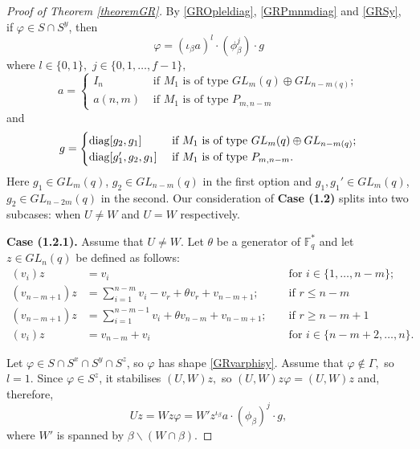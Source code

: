 \begin{proof}[Proof of Theorem {\rm \ref{theoremGR}}]
 By \eqref{GROpleldiag}, \eqref{GRPmnmdiag} and \eqref{GRSy}, if $\varphi \in S \cap S^y$, then 
\begin{equation}
\label{GRvarphisy}
\varphi = (\iota_{\beta} a )^l \cdot (\phi_{\beta}^j) \cdot g
\end{equation}
where $l \in \{0,1\},$ $j \in \{0, 1, \ldots, f-1\},$
$$a = \begin{cases}
I_n  &  \text{ if } M_1 \text{ is of type } GL_m(q) \oplus GL_{n-m(q)};\\
a(n,m) & \text{ if } M_1 \text{ is of type } P_{m, n-m}

\end{cases}
$$
and
$$g = 
\begin{cases}
\diag[g_2, g_1] &  \text{ if } M_1 \text{ is of type } GL_m(q) \oplus GL_{n-m(q)};\\
\diag[g_1', g_2, g_1] & \text{ if } M_1 \text{ is of type } P_{m, n-m}.
\end{cases}$$
Here $g_1 \in GL_m(q)$, $g_2 \in GL_{n-m}(q)$ in the first option and  $g_1, g_1' \in GL_m(q)$, ${g_2 \in GL_{n-2m}(q)}$ in the second. Our consideration of {\bf Case (1.2)} splits into two subcases:
when  $U \ne W$
and  $U=W$ respectively.

\medskip

{\bf Case (1.2.1).} Assume that $U \ne W$. Let $\theta$ be a generator of $\mathbb{F}_q^*$ and let $z \in GL_n(q)$ be defined as follows:
\begin{equation}
\label{GRzdef1}
\begin{aligned}
(v_i)z & = v_i &&\text{ for } i \in \{1, \ldots, n-m\}; \\
(v_{n-m+1})z & =  \sum_{i=1}^{n-m} v_i -v_r + \theta v_{r} + v_{n-m+1}; && \text{ if } r \le n-m\\
(v_{n-m+1})z & =  \sum_{i=1}^{n-m-1} v_i  + \theta v_{n-m} + v_{n-m+1}; && \text{ if } r \ge n-m+1\\
(v_i)z & =  v_{n-m} + v_{i} && \text{ for } i \in \{n-m+2, \ldots, n\}.
\end{aligned} 
\end{equation}

Let $\varphi \in S \cap S^x \cap S^y \cap S^z$, so $\varphi$ has shape \eqref{GRvarphisy}.   Assume that $\varphi \notin \Gamma,$ so $l=1.$ Since $\varphi \in S^z$, it stabilises $(U,W)z,$ so $(U,W)z \varphi =(U,W)z$ and, therefore, 
$$Uz=Wz \varphi = W'z^{\iota_{\beta}}a\cdot (\phi_{\beta})^j \cdot g,$$
where $W'$ is spanned by $\beta \backslash (W \cap \beta).$  


\end{proof}
